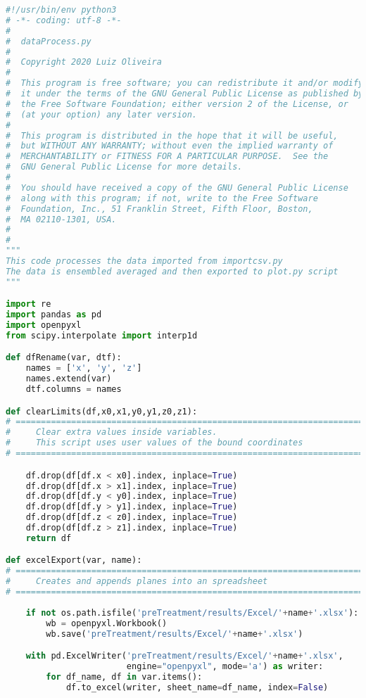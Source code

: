 \begin{lstlisting}[language=python]
#!/usr/bin/env python3
# -*- coding: utf-8 -*-
#
#  dataProcess.py
#  
#  Copyright 2020 Luiz Oliveira
#  
#  This program is free software; you can redistribute it and/or modify
#  it under the terms of the GNU General Public License as published by
#  the Free Software Foundation; either version 2 of the License, or
#  (at your option) any later version.
#  
#  This program is distributed in the hope that it will be useful,
#  but WITHOUT ANY WARRANTY; without even the implied warranty of
#  MERCHANTABILITY or FITNESS FOR A PARTICULAR PURPOSE.  See the
#  GNU General Public License for more details.
#  
#  You should have received a copy of the GNU General Public License
#  along with this program; if not, write to the Free Software
#  Foundation, Inc., 51 Franklin Street, Fifth Floor, Boston,
#  MA 02110-1301, USA.
#  
#  
"""
This code processes the data imported from importcsv.py
The data is ensembled averaged and then exported to plot.py script
"""

import re
import pandas as pd
import openpyxl
from scipy.interpolate import interp1d

def dfRename(var, dtf):
    names = ['x', 'y', 'z']
    names.extend(var)
    dtf.columns = names

def clearLimits(df,x0,x1,y0,y1,z0,z1):
# =============================================================================
#     Clear extra values inside variables.
#     This script uses user values of the bound coordinates
# =============================================================================

    df.drop(df[df.x < x0].index, inplace=True)
    df.drop(df[df.x > x1].index, inplace=True)
    df.drop(df[df.y < y0].index, inplace=True)
    df.drop(df[df.y > y1].index, inplace=True)
    df.drop(df[df.z < z0].index, inplace=True)
    df.drop(df[df.z > z1].index, inplace=True)
    return df

def excelExport(var, name):
# =============================================================================
#     Creates and appends planes into an spreadsheet
# =============================================================================
    
    if not os.path.isfile('preTreatment/results/Excel/'+name+'.xlsx'):
        wb = openpyxl.Workbook()
        wb.save('preTreatment/results/Excel/'+name+'.xlsx')

    with pd.ExcelWriter('preTreatment/results/Excel/'+name+'.xlsx',
                        engine="openpyxl", mode='a') as writer:
        for df_name, df in var.items():
            df.to_excel(writer, sheet_name=df_name, index=False)
            

\end{lstlisting}
